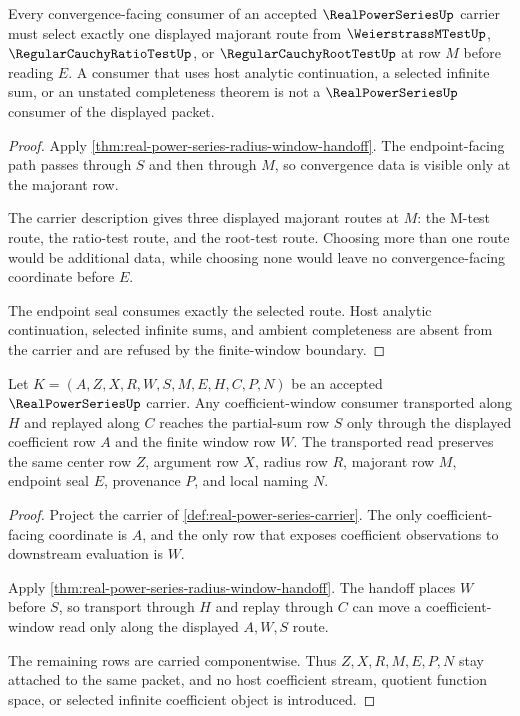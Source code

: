 \begin{theorem}\label{thm:real-power-series-majorant-consumer-coverage}
Every convergence-facing consumer of an accepted $\RealPowerSeriesUp$ carrier must select exactly one displayed majorant route from $\WeierstrassMTestUp$, $\RegularCauchyRatioTestUp$, or $\RegularCauchyRootTestUp$ at row $M$ before reading $E$. A consumer that uses host analytic continuation, a selected infinite sum, or an unstated completeness theorem is not a $\RealPowerSeriesUp$ consumer of the displayed packet.
\end{theorem}
\begin{proof}
Apply \autoref{thm:real-power-series-radius-window-handoff}. The endpoint-facing path passes through $S$ and then through $M$, so convergence data is visible only at the majorant row.

The carrier description gives three displayed majorant routes at $M$: the M-test route, the ratio-test route, and the root-test route. Choosing more than one route would be additional data, while choosing none would leave no convergence-facing coordinate before $E$.

The endpoint seal consumes exactly the selected route. Host analytic continuation, selected infinite sums, and ambient completeness are absent from the carrier and are refused by the finite-window boundary.
\end{proof}

\begin{theorem}\label{thm:real-power-series-coefficient-window-transport}
Let $K=(A,Z,X,R,W,S,M,E,H,C,P,N)$ be an accepted $\RealPowerSeriesUp$ carrier. Any coefficient-window consumer transported along $H$ and replayed along $C$ reaches the partial-sum row $S$ only through the displayed coefficient row $A$ and the finite window row $W$. The transported read preserves the same center row $Z$, argument row $X$, radius row $R$, majorant row $M$, endpoint seal $E$, provenance $P$, and local naming $N$.
\end{theorem}
\begin{proof}
Project the carrier of \autoref{def:real-power-series-carrier}. The only coefficient-facing coordinate is $A$, and the only row that exposes coefficient observations to downstream evaluation is $W$.

Apply \autoref{thm:real-power-series-radius-window-handoff}. The handoff places $W$ before $S$, so transport through $H$ and replay through $C$ can move a coefficient-window read only along the displayed $A,W,S$ route.

The remaining rows are carried componentwise. Thus $Z,X,R,M,E,P,N$ stay attached to the same packet, and no host coefficient stream, quotient function space, or selected infinite coefficient object is introduced.
\end{proof}

